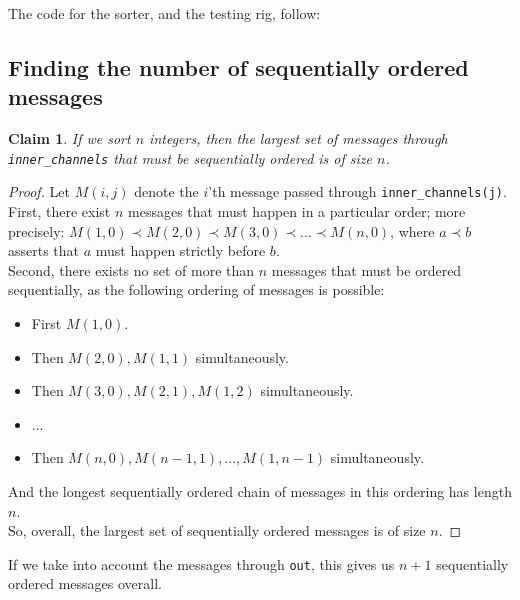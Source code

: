\newtheorem{theorem}{Claim}

The code for the sorter, and the testing rig, follow:



\subsection{Finding the number of sequentially ordered messages}

\begin{theorem}
    If we sort $n$ integers, then the largest set of messages through \texttt{inner\_channels} that must be sequentially ordered is of size $n$.
\end{theorem}
\begin{proof}
Let $M(i, j)$ denote the $i$'th message passed through \texttt{inner\_channels(j)}. \\
First, there exist $n$ messages that must happen in a particular order; more precisely: $M(1, 0) \prec M(2, 0) \prec M(3, 0) \prec ... \prec M(n, 0)$, where $a \prec b$ asserts that $a$ must happen strictly before $b$. \\
Second, there exists no set of more than $n$ messages that must be ordered sequentially, as the following ordering of messages is possible:
\begin{itemize}
\item First $M(1, 0)$.
\item Then $M(2, 0), M(1, 1)$ simultaneously.
\item Then $M(3, 0), M(2, 1), M(1, 2)$ simultaneously.
\item ...
\item Then $M(n, 0), M(n-1, 1), ..., M(1, n-1)$ simultaneously.
\end{itemize}
And the longest sequentially ordered chain of messages in this ordering has length $n$. \\
So, overall, the largest set of sequentially ordered messages is of size $n$.
\end{proof}

If we take into account the messages through \texttt{out}, this gives us $n+1$ sequentially ordered messages overall.
